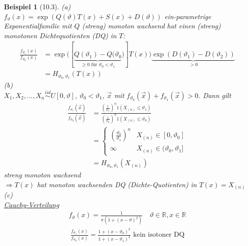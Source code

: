 \documentclass[a4paper,openany]{book}
\theoremstyle{mytheoremstyle}
\newtheorem*{bei}{Beispiel}
\theoremstyle{mytheoremstyle2}
\begin{document}
\begin{bei}[10.3]
  (a)\\
  $f _{\vartheta }(x)=\exp(Q(\vartheta )T(x)+S(x)+D(\vartheta ))$ ein-parametrige Exponentialfamilie mit $Q$ (streng) monoton wachsend hat einen (streng) monotonen Dichtequotienten (DQ) in $T$:
  \begin{align*}
    \frac{f _{\vartheta _1}(x)}{f _{\vartheta _0}(x)}
    &=\exp \big([\underbrace{Q (\vartheta _1)-Q(\vartheta _0}_{\geq 0\text{ für }\vartheta _0<\vartheta _1})]T(x)\big)\underbrace{\exp \left(D(\vartheta _1)-D(\vartheta _2)\right)}_{> 0 } \\
    &=H _{\vartheta _0,\vartheta _1}(T(x))
  \end{align*}
  (b)\\
  $X_1,X_2,...,X_n \overset{iid}\sim U[0,\vartheta ]$, $\vartheta _0<\vartheta _1$, $\vec x$ mit $f _{\vartheta _0}(\vec x)+f _{\vartheta _1}(\vec x)>0$. Dann gilt 
  \begin{align*}
    \frac{f _{\vartheta _1}(\vec x)}{f _{\vartheta _0}(\vec x)}
    &=\frac{\left(\frac{1}{\vartheta _1}\right)^n1(X _{(n)}\leq \vartheta _1)}{\left(\frac{1}{\vartheta _0}\right)^n1(X _{(n)}\leq \vartheta _0)}\\
    &=\begin{cases}
      \left(\frac{\vartheta _0}{\vartheta _1}\right)^n &X _{(n)}\in [0,\vartheta _0]\\
      \infty &X _{(n)}\in (\vartheta _0,\vartheta _1]
    \end{cases}\\
    &=H _{\vartheta _0,\vartheta _1}(X _{(n)})
  \end{align*}
  streng monoton wachsend \\
  $\Rightarrow T(x)$ hat monoton wachsenden DQ (Dichte-Quotienten) in $T(x)=X _{(n)}$ \\
  (c)\\
  \underline{Cauchy-Verteilung}
  \begin{align*}
    f _{\vartheta }(x)=\frac{1}{\pi (1+(x-\vartheta )^2)}\quad \vartheta \in \mathbb{R},x \in \mathbb{R}
  \end{align*}
  \begin{align*}
    \frac{f _{\vartheta _1}(x)}{f _{\vartheta _0}(x)}=\frac{1+(x-\vartheta _0)^2}{1+(x-\vartheta _1)^2}\text{ kein isotoner DQ}
  \end{align*}
\end{bei}
\end{document}
